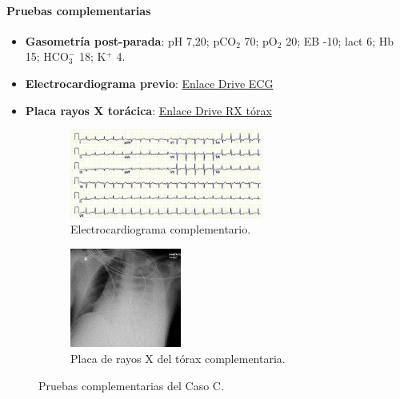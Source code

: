 \paragraph{Pruebas complementarias}
\begin{itemize}[topsep=0pt, partopsep=0pt,itemsep=0pt,parsep=0pt]
    \item \textbf{Gasometría post-parada}: pH 7,20; pCO$_2$ 70; pO$_2$ 20; EB -10; lact 6; Hb 15; HCO$_3^-$ 18; K$^+$ 4.
    \item \textbf{Electrocardiograma previo}: \href{https://drive.google.com/file/d/192ypfJwq66tplKSGUsnxHWUPYwEQuJeX/view?usp=share\_link}{Enlace Drive ECG}
    \item \textbf{Placa rayos X torácica}: \href{https://drive.google.com/file/d/1_oLDL2m2RXA4fkvJ76m1YXThYZ4J_dJR/view?usp=share\_link}{Enlace Drive RX tórax}
\end{itemize}
\begin{figure}[hptb]
    \centering
    \begin{subfigure}{.5\textwidth}
      \centering
      \includegraphics[width=0.7\textwidth]{./imagenes/UCIDoc-SVICasoCECG.png}
      \caption{\label{fig:Brusilov:SVI:CasoCECG}Electrocardiograma complementario.}
    \end{subfigure}%
    \begin{subfigure}{.5\textwidth}
      \centering
      \includegraphics[width=0.4\textwidth]{./imagenes/UCIDoc-SVICasoCRXTorax.png}
      \caption{\label{fig:Brusilov:SVI:CasoCRXTorax}Placa de rayos X del tórax complementaria.}
    \end{subfigure}
    \caption{\label{fig:Brusilov:SVI:PruebasCasoC}Pruebas complementarias del Caso C.}
\end{figure}

